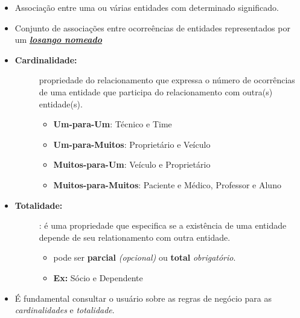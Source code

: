 \documentclass[12pt,a4paper]{article}
\begin{document}
\begin{itemize}
    \item
        Associação entre uma ou várias entidades com determinado significado.
    \item
        Conjunto de associações entre ocorreências de entidades representados por um \textit{\textbf{\underline{losango nomeado}}}
    \item \begin{description}
            \item[\textbf{Cardinalidade:}] 
                propriedade do relacionamento que expressa o nú\-me\-ro de ocorrências de uma entidade que participa do relacionamento com outra(s) entidade(s).
                \begin{itemize}
                    \item \textbf{Um-para-Um}: Técnico e Time
                    \item \textbf{Um-para-Muitos}: Proprietário e Veículo
                    \item \textbf{Muitos-para-Um}: Veículo e Proprietário
                    \item \textbf{Muitos-para-Muitos}: Paciente e Médico, Professor e Aluno
                \end{itemize}
     \end{description}
     \item \begin{description}
             \item[\textbf{Totalidade:}]: é uma propriedade que especifica se a existência de uma entidade depende de seu relationamento com outra entidade.
                 \begin{itemize}
                     \item pode ser \textbf{parcial} \textit{(opcional)} ou \textbf{total} \textit{obrigatório}.
                     \item \textbf{Ex:} Sócio e Dependente
                 \end{itemize}
         \end{description}
     \item É fundamental consultar o usuário sobre as regras de negócio para as \textit{cardinalidades} e \textit{totalidade}.
\end{itemize}

\newpage
\end{document}

